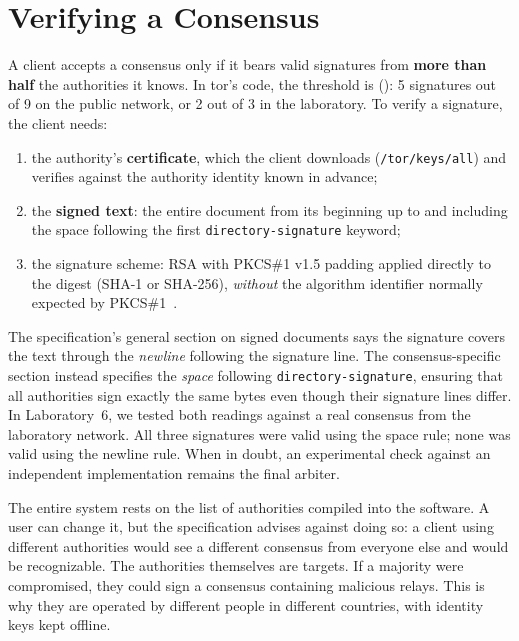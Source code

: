 \section{Verifying a Consensus}\label{sec:dir-firme}

A client accepts a consensus only if it bears valid signatures from \textbf{more than half} the authorities it knows. In tor's code, the threshold is  (): 5 signatures out of 9 on the public network, or 2 out of 3 in the laboratory. To verify a signature, the client needs:
\begin{enumerate}
  \item the authority's \textbf{certificate}, which the client downloads (\nolinkurl{/tor/keys/all}) and verifies against the authority identity known in advance;
  \item the \textbf{signed text}: the entire document from its beginning up to and including the space following the first \texttt{directory-signature} keyword;
  \item the signature scheme: RSA with PKCS\#1 v1.5 padding applied directly to the digest (SHA-1 or SHA-256), \emph{without} the algorithm identifier normally expected by PKCS\#1~.
\end{enumerate}

\begin{approfondimento}
The specification's general section on signed documents says the signature covers the text through the \emph{newline} following the signature line. The consensus-specific section instead specifies the \emph{space} following \texttt{directory-signature}, ensuring that all authorities sign exactly the same bytes even though their signature lines differ. In Laboratory~6, we tested both readings against a real consensus from the laboratory network. All three signatures were valid using the space rule; none was valid using the newline rule. When in doubt, an experimental check against an independent implementation remains the final arbiter.
\end{approfondimento}

\begin{attenzione}
The entire system rests on the list of authorities compiled into the software. A user can change it, but the specification advises against doing so: a client using different authorities would see a different consensus from everyone else and would be recognizable. The authorities themselves are targets. If a majority were compromised, they could sign a consensus containing malicious relays. This is why they are operated by different people in different countries, with identity keys kept offline.
\end{attenzione}

